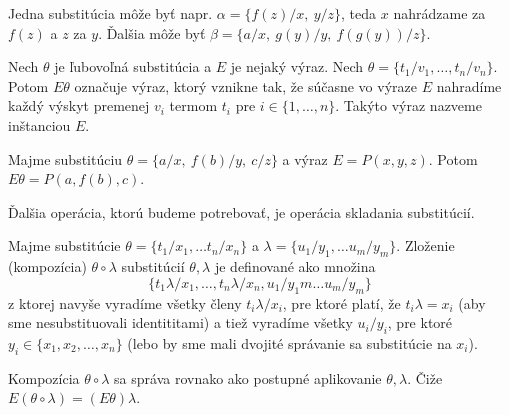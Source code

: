 \begin{priklad}
    Jedna substitúcia môže byť napr.
    $\alpha = \{ f(z)/x,\ y/z\}$, teda $x$ nahrádzame za $f(z)$ a
    $z$ za $y$.
    Ďalšia môže byť $\beta = \{ a/x,\ g(y)/y,\ f(g(y))/z\}$.
\end{priklad}

\begin{definicia}
    Nech $\theta$ je ľubovoľná substitúcia a $E$ je nejaký výraz.
    Nech $\theta = \{ t_1/v_1, \dots, t_n/v_n\}$.
    Potom $E\theta$ označuje výraz, ktorý vznikne tak,
    že súčasne vo výraze $E$ nahradíme každý výskyt premenej $v_i$ termom $t_i$
    pre $i \in \{1,\dots,n\}$. Takýto výraz nazveme inštanciou $E$.
\end{definicia}

\begin{priklad}
    Majme substitúciu $\theta=\{a/x,\ f(b)/y,\ c/z\}$
    a výraz $E = P(x, y, z)$.
    Potom $E\theta = P(a, f(b), c)$.
\end{priklad}

\medskip
\noindent
Ďalšia operácia, ktorú budeme potrebovať, je operácia skladania
substitúcií.

\begin{definicia}
    Majme substitúcie $\theta = \{t_1/x_1, \ldots t_n/x_n\}$ a
    $\lambda = \{ u_1/y_1, \ldots u_m/y_m \}$.
    Zloženie (kompozícia) $\theta \circ \lambda$ substitúcií
    $\theta,\lambda$ je definované ako množina
    \begin{equation*}
        \{t_1 \lambda/x_1, \dots, t_n \lambda/x_n, u_1/y_1m \dots u_m/y_m \}
    \end{equation*}
    z ktorej navyše vyradíme všetky členy $t_i\lambda/x_i$,
    pre ktoré platí, že $t_i \lambda = x_i$ (aby sme nesubstituovali
    identititami)
    a tiež vyradíme všetky $u_i/y_i$,
    pre ktoré $y_i \in \{x_1, x_2, \dots, x_n\}$ (lebo by sme mali
    dvojité správanie sa substitúcie na $x_i$).
\end{definicia}

\begin{poznamka}
    Kompozícia $\theta \circ \lambda$ sa správa rovnako ako postupné
    aplikovanie $\theta, \lambda$. Čiže
    $E(\theta \circ \lambda) = (E\theta)\lambda$.
\end{poznamka}


